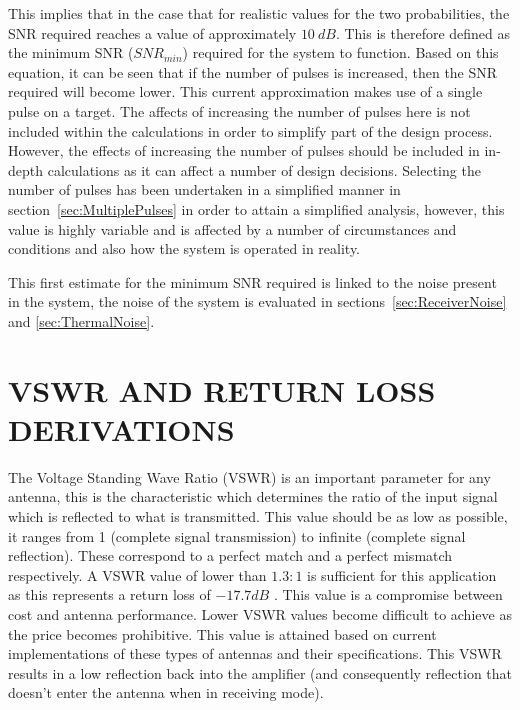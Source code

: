 \documentclass[11pt]{witseiepaper}
\begin{document}
\begin{bibunit}[witseie]
This implies that in the case that for realistic values for the two probabilities, the SNR required reaches a value of approximately $10~dB$.
This is therefore defined as the minimum SNR ($SNR_{min}$) required for the system to function.
Based on this equation, it can be seen that if the number of pulses is increased, then the SNR required will become lower. This current approximation makes use of a single pulse on a target. The affects of increasing the number of pulses here is not included within the calculations in order to simplify part of the design process. However, the effects of increasing the number of pulses should be included in in-depth calculations as it can affect a number of design decisions. Selecting the number of pulses has been undertaken in a simplified manner in section~\ref{sec:MultiplePulses} in order to attain a simplified analysis, however, this value is highly variable and is affected by a number of circumstances and conditions and also how the system is operated in reality.


This first estimate for the minimum SNR required is linked to the noise present in the system, the noise of the system is evaluated in sections~\ref{sec:ReceiverNoise} and \ref{sec:ThermalNoise}.


\section{VSWR AND RETURN LOSS DERIVATIONS} \label{sec:VSWRandReturnLossDerivations}
The Voltage Standing Wave Ratio (VSWR) is an important parameter for any antenna, this is the characteristic which determines the ratio of the input signal which is reflected to what is transmitted. This value should be as low as possible, it ranges from 1 (complete signal transmission) to infinite (complete signal reflection). These correspond to a perfect match and a perfect mismatch respectively.
A VSWR value of lower than $1.3:1$ is sufficient for this application as this represents a return loss of $-17.7 dB$ \cite{AntennaPrice1,AntennaPrice2,AntennaPrice3,AntennaPrice4}. This value is a compromise between cost and antenna performance. Lower VSWR values become difficult to achieve as the price becomes prohibitive. This value is attained based on current implementations of these types of antennas and their specifications.
This VSWR results in a low reflection back into the amplifier (and consequently reflection that doesn't enter the antenna when in receiving mode).


\end{bibunit}
\end{document}
